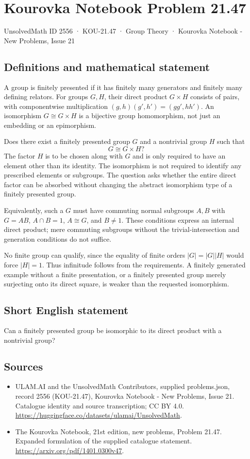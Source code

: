 \documentclass[11pt,a4paper]{article}
\begin{document}
\section*{Kourovka Notebook Problem 21.47}\label{2556}
{\small UnsolvedMath ID 2556 · KOU-21.47 · Group Theory · Kourovka Notebook - New Problems, Issue 21}
\subsection{Definitions and mathematical statement}
A group is finitely presented if it has finitely many generators and
finitely many defining relators. For groups $G,H$, their direct product
$G\times H$ consists of pairs, with componentwise multiplication
$(g,h)(g',h')=(gg',hh')$.
An isomorphism $G\cong G\times H$ is a bijective group homomorphism,
not just an embedding or an epimorphism.

Does there exist a finitely presented group $G$ and a nontrivial group
$H$ such that
\[
 G\cong G\times H?
\]
The factor $H$ is to be chosen along with $G$ and is only required to
have an element other than its identity. The isomorphism is not required
to identify any prescribed elements or subgroups. The question asks
whether the entire direct factor can be absorbed without changing the
abstract isomorphism type of a finitely presented group.

Equivalently, such a $G$ must have commuting normal subgroups $A,B$
with $G=AB$, $A\cap B=1$, $A\cong G$, and $B\ne1$. These conditions
express an internal direct product; mere commuting subgroups without
the trivial-intersection and generation conditions do not suffice.

No finite group can qualify, since the equality of finite orders
$|G|=|G||H|$ would force $|H|=1$. Thus infinitude follows from the
requirements. A finitely generated example without a finite presentation,
or a finitely presented group merely surjecting onto its direct square,
is weaker than the requested isomorphism.
\subsection{Short English statement}
Can a finitely presented group be isomorphic to its direct product with a nontrivial group?
\subsection{Sources}
\begin{itemize}
\item[S1] ULAM.AI and the UnsolvedMath Contributors, supplied problems.json, record 2556 (KOU-21.47), Kourovka Notebook - New Problems, Issue 21. Catalogue identity and source transcription; CC BY 4.0.
\url{https://huggingface.co/datasets/ulamai/UnsolvedMath}.
\item[S2] The Kourovka Notebook, 21st edition, new problems, Problem 21.47. Expanded formulation of the supplied catalogue statement.
\url{https://arxiv.org/pdf/1401.0300v47}.
\end{itemize}
\end{document}
